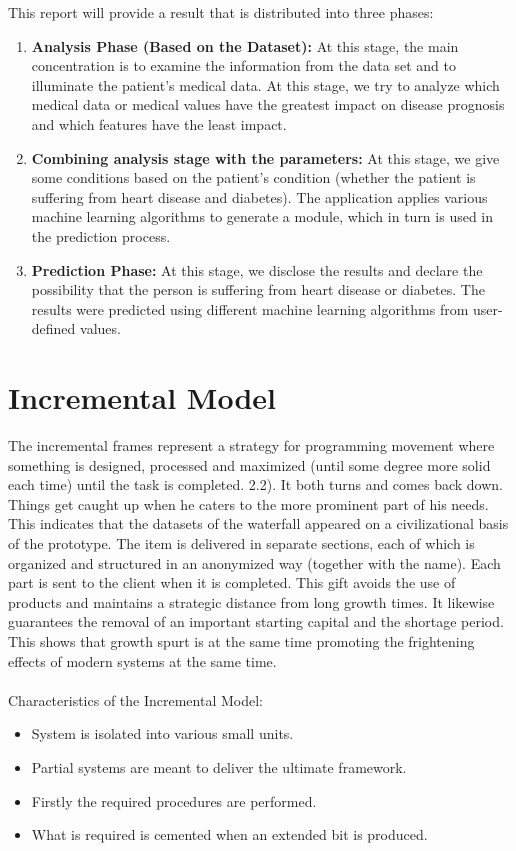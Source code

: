 \documentclass[oneside,12pt]{Classes/VTU}
\begin{document}
    	
    	This report will provide a result that is distributed into three phases:
    
    	\begin{enumerate}
    		\item \textbf{Analysis Phase (Based on the Dataset): } At this stage, the main concentration is to examine the information from the data set and to illuminate the patient's medical data. At this stage, we try to analyze which medical data or medical values have the greatest impact on disease prognosis and which features have the least impact.
    	\item \textbf{Combining analysis stage with the parameters:} At this stage, we give some conditions based on the patient's condition (whether the patient is suffering from heart disease and diabetes). The application applies various machine learning algorithms to generate a module, which in turn is used in the prediction process.  
    	\item \textbf{Prediction Phase:} At this stage, we disclose the results and declare the possibility that the person is suffering from heart disease or diabetes. The results were predicted using different machine learning algorithms from user-defined values.
    	\end{enumerate}
    	
    	\section{Incremental Model}
    	
    	The incremental frames represent a strategy for programming movement where something is designed, processed and maximized (until some degree more solid each time) until the task is completed. 2.2). It both turns and comes back down. Things get caught up when he caters to the more prominent part of his needs. This indicates that the datasets of the waterfall appeared on a civilizational basis of the prototype. The item is delivered in separate sections, each of which is organized and structured in an anonymized way (together with the name). Each part is sent to the client when it is completed. This gift avoids the use of products and maintains a strategic distance from long growth times. It likewise guarantees the removal of an important starting capital and the shortage period. This shows that growth spurt is at the same time promoting the frightening effects of modern systems at the same time.
    	\paragraph{}
    	Characteristics of the Incremental Model:
    	\begin{itemize}
    		\item System is isolated into various small units.
    		\item Partial systems are meant to deliver the ultimate framework.
    		\item Firstly the required procedures are performed.
    		\item What is required is cemented when an extended bit is produced.
    	\end{itemize}
    	
\end{document}

